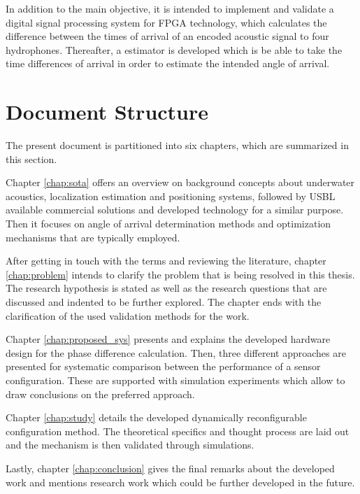 In addition to the main objective, it is intended to implement and validate a digital signal processing system for FPGA technology, which calculates the difference between the times of arrival of an encoded acoustic signal to four hydrophones.  Thereafter, a estimator is developed which is be able to take the time differences of arrival in order to estimate the intended angle of arrival.

\section{Document Structure}

The present document is partitioned into six chapters, which are summarized in this section.

Chapter \ref{chap:sota} offers an overview on background concepts about underwater acoustics, localization estimation and positioning systems, followed by USBL available commercial solutions and developed technology for a similar purpose. Then it focuses on angle of arrival determination methods and optimization mechanisms that are typically employed.

After getting in touch with the terms and reviewing the literature, chapter \ref{chap:problem} intends to clarify the problem that is being resolved in this thesis. The research hypothesis is stated as well as the research questions that are discussed and indented to be further explored. The chapter ends with the clarification of the used validation methods for the work. 

Chapter \ref{chap:proposed_sys} presents and explains the developed hardware design for the phase difference calculation. Then, three different approaches are presented for systematic comparison between the performance of a sensor configuration. These are supported with simulation experiments which allow to draw conclusions on the preferred approach.

Chapter \ref{chap:study} details the developed dynamically reconfigurable configuration method. The theoretical specifics and thought process are laid out and the mechanism is then validated through simulations.

Lastly, chapter \ref{chap:conclusion} gives the final remarks about the developed work and mentions research work which could be further developed in the future.  
